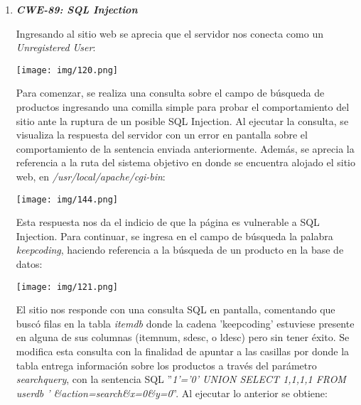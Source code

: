 \documentclass[12pt,oneside,a4paper]{book}
\begin{document}
\begin{enumerate}
\vspace{2em}

\item 	\textbf{\textit{CWE-89: SQL Injection}}

\vspace{1em}

\hspace{20pt}
Ingresando al sitio web se aprecia que el servidor nos conecta como un \textit{Unregistered User}:

\vspace{1em}

\begin{center}
    \texttt{[image: img/120.png]}
\end{center}

\vspace{1em}

\hspace{20pt}
Para comenzar, se realiza una consulta sobre el campo de búsqueda de productos ingresando una comilla simple para probar el comportamiento del sitio ante la ruptura de un posible SQL Injection. Al ejecutar la consulta, se visualiza la respuesta del servidor con un error en pantalla sobre el comportamiento de la sentencia enviada anteriormente. Además, se aprecia la referencia a la ruta del sistema objetivo en donde se encuentra alojado el sitio web, en \textit{/usr/local/apache/cgi-bin}:

\vspace{1em}

\begin{center}
    \texttt{[image: img/144.png]}
\end{center}

\vspace{1em}

\hspace{20pt}
Esta respuesta nos da el indicio de que la página es vulnerable a SQL Injection. Para continuar, se ingresa en el campo de búsqueda la palabra \textit{keepcoding}, haciendo referencia a la búsqueda de un producto en la base de datos:
\vspace{1em}

\begin{center}
    \texttt{[image: img/121.png]}
\end{center}

\vspace{1em}

\hspace{20pt}
El sitio nos responde con una consulta SQL en pantalla, comentando que buscó filas en la tabla \textit{itemdb} donde la cadena 'keepcoding' estuviese presente en alguna de sus columnas (itemnum, sdesc, o ldesc) pero sin tener éxito. Se modifica esta consulta con la finalidad de apuntar a las casillas por donde la tabla entrega información sobre los productos a través del parámetro \textit{searchquery}, con la sentencia SQL ''\textit{1'='0' UNION SELECT 1,1,1,1 FROM userdb ' \&action=search\&x=0\&y=0}''. Al ejecutar lo anterior se obtiene:


\end{enumerate}
\end{document}
